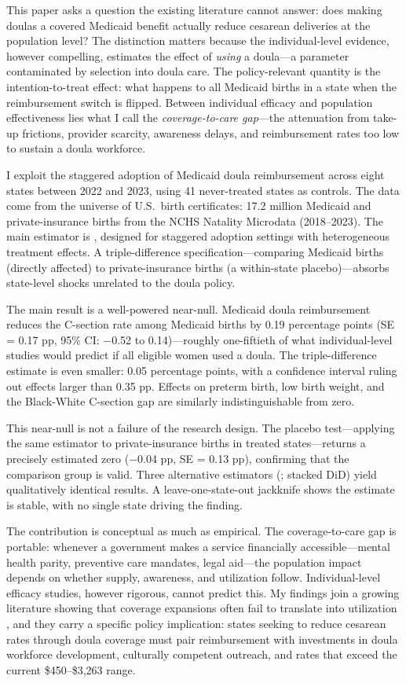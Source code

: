 \documentclass[12pt]{article}
\begin{document}
This paper asks a question the existing literature cannot answer: does making doulas a covered Medicaid benefit actually reduce cesarean deliveries at the population level? The distinction matters because the individual-level evidence, however compelling, estimates the effect of \textit{using} a doula---a parameter contaminated by selection into doula care. The policy-relevant quantity is the intention-to-treat effect: what happens to all Medicaid births in a state when the reimbursement switch is flipped. Between individual efficacy and population effectiveness lies what I call the \textit{coverage-to-care gap}---the attenuation from take-up frictions, provider scarcity, awareness delays, and reimbursement rates too low to sustain a doula workforce.

I exploit the staggered adoption of Medicaid doula reimbursement across eight states between 2022 and 2023, using 41 never-treated states as controls. The data come from the universe of U.S.\ birth certificates: 17.2 million Medicaid and private-insurance births from the NCHS Natality Microdata (2018--2023). The main estimator is \citet{callaway2021}, designed for staggered adoption settings with heterogeneous treatment effects. A triple-difference specification---comparing Medicaid births (directly affected) to private-insurance births (a within-state placebo)---absorbs state-level shocks unrelated to the doula policy.

The main result is a well-powered near-null. Medicaid doula reimbursement reduces the C-section rate among Medicaid births by 0.19 percentage points (SE = 0.17 pp, 95\% CI: $-$0.52 to 0.14)---roughly one-fiftieth of what individual-level studies would predict if all eligible women used a doula. The triple-difference estimate is even smaller: 0.05 percentage points, with a confidence interval ruling out effects larger than 0.35 pp. Effects on preterm birth, low birth weight, and the Black-White C-section gap are similarly indistinguishable from zero.

This near-null is not a failure of the research design. The placebo test---applying the same estimator to private-insurance births in treated states---returns a precisely estimated zero ($-$0.04 pp, SE = 0.13 pp), confirming that the comparison group is valid. Three alternative estimators (\citealt{sun2021}; stacked DiD) yield qualitatively identical results. A leave-one-state-out jackknife shows the estimate is stable, with no single state driving the finding.

The contribution is conceptual as much as empirical. The coverage-to-care gap is portable: whenever a government makes a service financially accessible---mental health parity, preventive care mandates, legal aid---the population impact depends on whether supply, awareness, and utilization follow. Individual-level efficacy studies, however rigorous, cannot predict this. My findings join a growing literature showing that coverage expansions often fail to translate into utilization \citep{dave2019, wherry2018}, and they carry a specific policy implication: states seeking to reduce cesarean rates through doula coverage must pair reimbursement with investments in doula workforce development, culturally competent outreach, and rates that exceed the current \$450--\$3,263 range.
\end{document}
